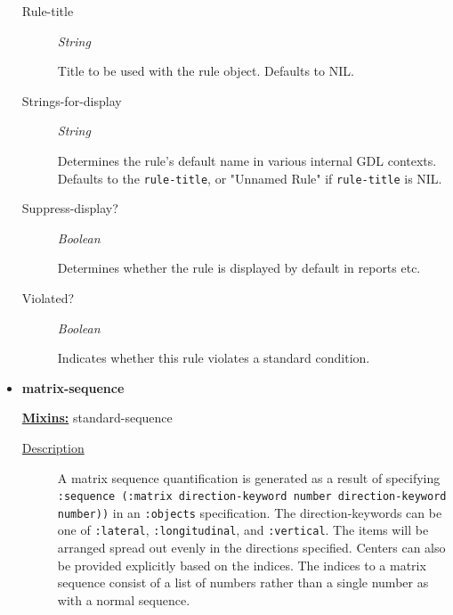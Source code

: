 \documentclass [11pt]{book}
\begin{document}
\begin{itemize}
\begin{description}
\item [Rule-title]
\emph{String}

 Title to be used with the rule object. Defaults to NIL.




\item [Strings-for-display]
\emph{String}

 Determines the rule's default name in various internal GDL contexts. Defaults to
the \texttt{rule-title}, or "Unnamed Rule" if \texttt{rule-title} is NIL.




\item [Suppress-display?]
\emph{Boolean}

 Determines whether the rule is displayed by default in reports etc.




\item [Violated?]
\emph{Boolean}

 Indicates whether this rule violates a standard condition.




\end{description}







\item {}
\label{prim:matrix-sequence}
\textbf{matrix-sequence}


\textbf{
\underline{Mixins:}} standard-sequence





\begin{description}

\item [
\underline{Description}]


A matrix sequence quantification is
generated as a result of specifying \texttt{:sequence (:matrix
direction-keyword number direction-keyword number))} in an
\texttt{:objects} specification. The direction-keywords can be one of
\texttt{:lateral}, \texttt{:longitudinal}, and \texttt{:vertical}. The
items will be arranged spread out evenly in the directions specified.
Centers can also be provided explicitly based on the indices.  The
indices to a matrix sequence consist of a list of numbers rather than
a single number as with a normal sequence.




\end{description}
\end{itemize}
\end{document}
